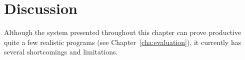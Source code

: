 





\section{Discussion}
\label{sec:discussion}
Although the system presented throughout this chapter can prove productive quite
a few realistic programs (see Chapter~\ref{cha:evaluation}), it currently has
several shortcomings and limitations.

